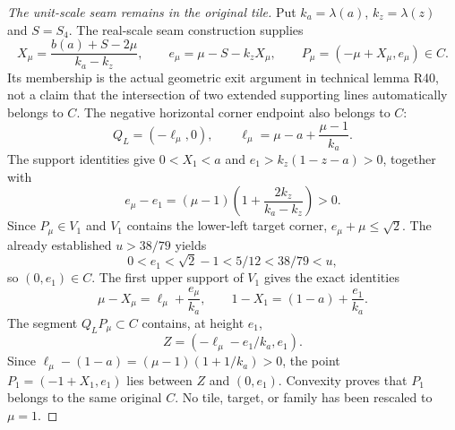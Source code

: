 \begin{proof}[The unit-scale seam remains in the original tile]
Put $k_a=\lambda(a)$, $k_z=\lambda(z)$ and $S=S_4$.
The real-scale seam construction supplies
\[
 X_\mu=\frac{b(a)+S-2\mu}{k_a-k_z},\qquad
 e_\mu=\mu-S-k_zX_\mu,\qquad
 P_\mu=(-\mu+X_\mu,e_\mu)\in C.
\]
Its membership is the actual geometric exit argument in technical lemma
R40, not a claim that the intersection of two extended supporting lines
automatically belongs to $C$.
The negative horizontal corner endpoint also belongs to $C$:
\[
 Q_L=(-\ell_\mu,0),\qquad
 \ell_\mu=\mu-a+\frac{\mu-1}{k_a}.
\]
The support identities give
$0<X_1<a$ and $e_1>k_z(1-z-a)>0$, together with
\[
 e_\mu-e_1=(\mu-1)\left(1+\frac{2k_z}{k_a-k_z}\right)>0.
\]
Since $P_\mu\in V_1$ and $V_1$ contains the lower-left target corner,
$e_\mu+\mu\le\sqrt2$. The already established $u>38/79$ yields
\[
 0<e_1<\sqrt2-1<5/12<38/79<u,
\]
so $(0,e_1)\in C$.
The first upper support of $V_1$ gives the exact identities
\[
 \mu-X_\mu=\ell_\mu+\frac{e_\mu}{k_a},\qquad
 1-X_1=(1-a)+\frac{e_1}{k_a}.
\]
The segment $Q_LP_\mu\subset C$ contains, at height $e_1$,
\[
 Z=(-\ell_\mu-e_1/k_a,e_1).
\]
Since $\ell_\mu-(1-a)=(\mu-1)(1+1/k_a)>0$, the point
$P_1=(-1+X_1,e_1)$ lies between $Z$ and $(0,e_1)$.
Convexity proves that $P_1$ belongs to the same original $C$.
No tile, target, or family has been rescaled to $\mu=1$.
\end{proof}


